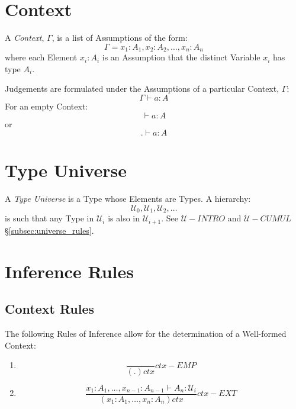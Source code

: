 \documentclass{article}
\begin{document}
\section{Context}\label{sec:type_context}

A \emph{Context}, $\Gamma$, is a list of Assumptions of the form:
\[
    \Gamma = x_1 : A_1, x_2 : A_2, \ldots, x_n : A_n
\]
where each Element $x_i : A_i$ is an Assumption that the distinct
Variable $x_i$ has type $A_i$.

Judgements are formulated under the Assumptions of a particular
Context, $\Gamma$:
\[
    \Gamma \vdash a : A
\]
For an empty Context:
\[
    \vdash a : A
\]
or
\[
    . \vdash a : A
\]



\section{Type Universe}\label{sec:type_universe}

A \emph{Type Universe} is a Type whose Elements are Types. A hierarchy:
\[
    \mathcal{U}_0, \mathcal{U}_1, \mathcal{U}_2, \ldots
\]
is such that any Type in $\mathcal{U}_i$ is also in
$\mathcal{U}_{i+1}$. See $\mathcal{U}-INTRO$ and $\mathcal{U}-CUMUL$
\S\ref{subsec:universe_rules}.



\section{Inference Rules}\label{sec:type_inference}

\subsection{Context Rules}

The following Rules of Inference allow for the determination of a
Well-formed Context:
\begin{enumerate}
\item
\[
    {
        \frac{}{(.)ctx}
    } ctx-EMP
\]
\item
\[
    {
        \frac
        {x_1:A_1, \ldots, x_{n-1}:A_{n-1} \vdash A_n : \mathcal{U}_i}
        {(x_1:A_1,\ldots,x_n:A_n) ctx}
    } ctx-EXT
\]
\end{enumerate}
\end{document}
